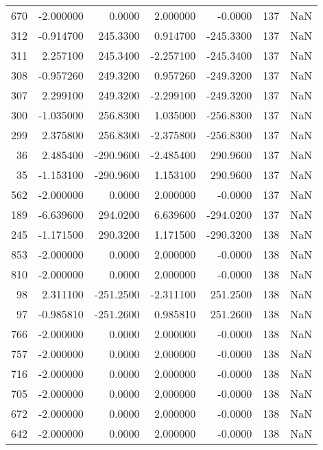 \begin{tabular}{rrrrrrr}
 670 &   -2.000000 &    0.0000 &    2.000000 &     -0.0000 &         137 & NaN \\
 312 &   -0.914700 &  245.3300 &    0.914700 &   -245.3300 &         137 & NaN \\
 311 &    2.257100 &  245.3400 &   -2.257100 &   -245.3400 &         137 & NaN \\
 308 &   -0.957260 &  249.3200 &    0.957260 &   -249.3200 &         137 & NaN \\
 307 &    2.299100 &  249.3200 &   -2.299100 &   -249.3200 &         137 & NaN \\
 300 &   -1.035000 &  256.8300 &    1.035000 &   -256.8300 &         137 & NaN \\
 299 &    2.375800 &  256.8300 &   -2.375800 &   -256.8300 &         137 & NaN \\
  36 &    2.485400 & -290.9600 &   -2.485400 &    290.9600 &         137 & NaN \\
  35 &   -1.153100 & -290.9600 &    1.153100 &    290.9600 &         137 & NaN \\
 562 &   -2.000000 &    0.0000 &    2.000000 &     -0.0000 &         137 & NaN \\
 189 &   -6.639600 &  294.0200 &    6.639600 &   -294.0200 &         137 & NaN \\
 245 &   -1.171500 &  290.3200 &    1.171500 &   -290.3200 &         138 & NaN \\
 853 &   -2.000000 &    0.0000 &    2.000000 &     -0.0000 &         138 & NaN \\
 810 &   -2.000000 &    0.0000 &    2.000000 &     -0.0000 &         138 & NaN \\
  98 &    2.311100 & -251.2500 &   -2.311100 &    251.2500 &         138 & NaN \\
  97 &   -0.985810 & -251.2600 &    0.985810 &    251.2600 &         138 & NaN \\
 766 &   -2.000000 &    0.0000 &    2.000000 &     -0.0000 &         138 & NaN \\
 757 &   -2.000000 &    0.0000 &    2.000000 &     -0.0000 &         138 & NaN \\
 716 &   -2.000000 &    0.0000 &    2.000000 &     -0.0000 &         138 & NaN \\
 705 &   -2.000000 &    0.0000 &    2.000000 &     -0.0000 &         138 & NaN \\
 672 &   -2.000000 &    0.0000 &    2.000000 &     -0.0000 &         138 & NaN \\
 642 &   -2.000000 &    0.0000 &    2.000000 &     -0.0000 &         138 & NaN \\

\end{tabular}
